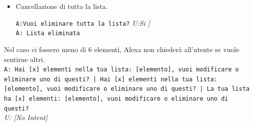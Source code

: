 \begin{itemize}
\begin{itemize}
		\item Cancellazione di tutta la lista.

	     \texttt{A:Vuoi eliminare tutta la lista?}
	     \textit{U:Si ]}\\
	     \texttt{A: Lista eliminata}

	\end{itemize}
	
	Nel caso ci fossero meno di 6 elementi, Alexa non chiederà all'utente se vuole sentirne altri.\\
	\texttt{A: Hai [x] elementi nella tua lista: [elemento], vuoi modificare o eliminare uno di questi? | Hai [x] elementi nella tua lista: [elemento], vuoi modificare o eliminare uno di questi? | La tua lista ha [x] elementi: [elemento], vuoi modificare o eliminare uno di questi? }\\
	\textit{U: [No Intent]}
\end{itemize}

